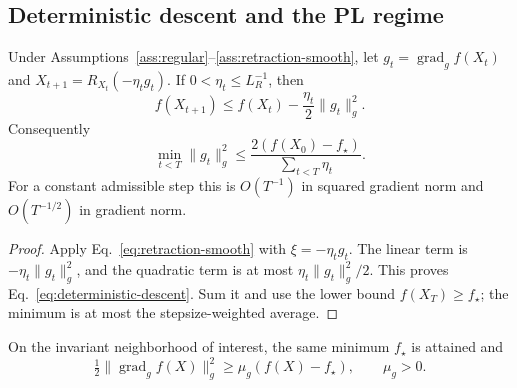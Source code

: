 \subsection{Deterministic descent and the PL regime}
\begin{theorem}
\label{thm:deterministic}
Under Assumptions~\ref{ass:regular}--\ref{ass:retraction-smooth}, let
$g_t=\operatorname{grad}_g f(X_t)$ and $X_{t+1}=R_{X_t}(-\eta_tg_t)$.
If $0<\eta_t\leq L_R^{-1}$, then
\begin{equation}
 f(X_{t+1})\leq f(X_t)-\frac{\eta_t}{2}\|g_t\|_g^2.
 \label{eq:deterministic-descent}
\end{equation}
Consequently
\begin{equation}
 \min_{t<T}\|g_t\|_g^2\leq
 \frac{2(f(X_0)-f_\star)}{\sum_{t<T}\eta_t}.
 \label{eq:deterministic-stationarity}
\end{equation}
For a constant admissible step this is $O(T^{-1})$ in squared gradient
norm and $O(T^{-1/2})$ in gradient norm.
\end{theorem}
\begin{proof}
Apply Eq.~\eqref{eq:retraction-smooth} with $\xi=-\eta_tg_t$.
The linear term is $-\eta_t\|g_t\|_g^2$, and the quadratic term is at
most $\eta_t\|g_t\|_g^2/2$. This proves
Eq.~\eqref{eq:deterministic-descent}. Sum it and use the lower bound
$f(X_T)\geq f_\star$; the minimum is at most the stepsize-weighted average.
\end{proof}

\begin{assumption}
\label{ass:pl}
On the invariant neighborhood of interest, the same minimum $f_\star$
is attained and
\begin{equation}
 \tfrac12\|\operatorname{grad}_g f(X)\|_g^2
 \geq\mu_g(f(X)-f_\star),\qquad \mu_g>0.
 \label{eq:quotient-pl}
\end{equation}
\end{assumption}

